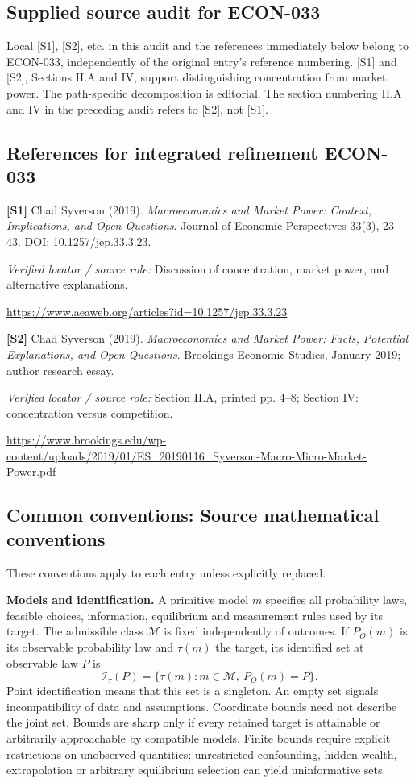 \documentclass[11pt,a4paper]{article}
\begin{document}
\subsection*{Supplied source audit for ECON-033}
Local [S1], [S2], etc. in this audit and the references immediately below
belong to ECON-033, independently of the original entry's reference numbering.
[S1] and [S2], Sections II.A and IV, support distinguishing concentration from market power. The path-specific decomposition is editorial.
The section numbering II.A and IV in the preceding audit refers to [S2], not [S1].
\subsection*{References for integrated refinement ECON-033}
{\footnotesize\raggedright
\par\noindent\textbf{[S1]} Chad Syverson (2019). \emph{Macroeconomics and Market Power: Context, Implications, and Open Questions}. Journal of Economic Perspectives 33(3), 23–43. DOI: 10.1257/jep.33.3.23.\par \textit{Verified locator / source role:} Discussion of concentration, market power, and alternative explanations.\par \url{https://www.aeaweb.org/articles?id=10.1257/jep.33.3.23}\par\smallskip
\par\noindent\textbf{[S2]} Chad Syverson (2019). \emph{Macroeconomics and Market Power: Facts, Potential Explanations, and Open Questions}. Brookings Economic Studies, January 2019; author research essay.\par \textit{Verified locator / source role:} Section II.A, printed pp. 4–8; Section IV: concentration versus competition.\par \url{https://www.brookings.edu/wp-content/uploads/2019/01/ES_20190116_Syverson-Macro-Micro-Market-Power.pdf}\par\smallskip
}

\subsection*{Common conventions: Source mathematical conventions}

These conventions apply to each entry unless explicitly replaced.

\textbf{Models and identification.} A primitive model \(m\) specifies all probability laws, feasible choices, information, equilibrium and measurement rules used by its target. The admissible class \(\mathcal M\) is fixed independently of outcomes. If \(P_O(m)\) is its observable probability law and \(\tau(m)\) the target, its identified set at observable law \(P\) is
\[
 \mathcal I_\tau(P)=\{\tau(m):m\in\mathcal M,\ P_O(m)=P\}.
\]
Point identification means that this set is a singleton. An empty set signals incompatibility of data and assumptions. Coordinate bounds need not describe the joint set. Bounds are sharp only if every retained target is attainable or arbitrarily approachable by compatible models. Finite bounds require explicit restrictions on unobserved quantities; unrestricted confounding, hidden wealth, extrapolation or arbitrary equilibrium selection can yield uninformative sets.
\end{document}
